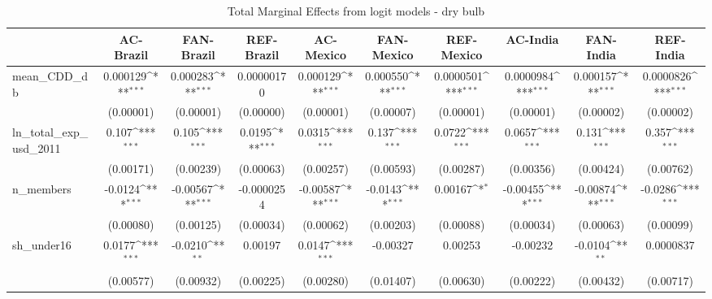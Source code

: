 \begin{table}[htbp]\centering
\def\sym#1{\ifmmode^{#1}\else\(^{#1}\)\fi}
\caption{Total Marginal Effects from logit models - dry bulb}
\begin{tabular}{l*{9}{c}}
\hline\hline
            &\multicolumn{1}{c}{AC-Brazil}&\multicolumn{1}{c}{FAN-Brazil}&\multicolumn{1}{c}{REF-Brazil}&\multicolumn{1}{c}{AC-Mexico}&\multicolumn{1}{c}{FAN-Mexico}&\multicolumn{1}{c}{REF-Mexico}&\multicolumn{1}{c}{AC-India}&\multicolumn{1}{c}{FAN-India}&\multicolumn{1}{c}{REF-India}\\
\hline
mean\_CDD\_db &    0.000129\sym{***}&    0.000283\sym{***}&  0.00000170         &    0.000129\sym{***}&    0.000550\sym{***}&   0.0000501\sym{***}&   0.0000984\sym{***}&    0.000157\sym{***}&   0.0000826\sym{***}\\
            &   (0.00001)         &   (0.00001)         &   (0.00000)         &   (0.00001)         &   (0.00007)         &   (0.00001)         &   (0.00001)         &   (0.00002)         &   (0.00002)         \\
ln\_total\_exp\_usd\_2011&       0.107\sym{***}&       0.105\sym{***}&      0.0195\sym{***}&      0.0315\sym{***}&       0.137\sym{***}&      0.0722\sym{***}&      0.0657\sym{***}&       0.131\sym{***}&       0.357\sym{***}\\
            &   (0.00171)         &   (0.00239)         &   (0.00063)         &   (0.00257)         &   (0.00593)         &   (0.00287)         &   (0.00356)         &   (0.00424)         &   (0.00762)         \\
n\_members   &     -0.0124\sym{***}&    -0.00567\sym{***}&  -0.0000254         &    -0.00587\sym{***}&     -0.0143\sym{***}&     0.00167\sym{*}  &    -0.00455\sym{***}&    -0.00874\sym{***}&     -0.0286\sym{***}\\
            &   (0.00080)         &   (0.00125)         &   (0.00034)         &   (0.00062)         &   (0.00203)         &   (0.00088)         &   (0.00034)         &   (0.00063)         &   (0.00099)         \\
sh\_under16  &      0.0177\sym{***}&     -0.0210\sym{**} &     0.00197         &      0.0147\sym{***}&    -0.00327         &     0.00253         &    -0.00232         &     -0.0104\sym{**} &   0.0000837         \\
            &   (0.00577)         &   (0.00932)         &   (0.00225)         &   (0.00280)         &   (0.01407)         &   (0.00630)         &   (0.00222)         &   (0.00432)         &   (0.00717)         \\

\end{tabular}
\end{table}
